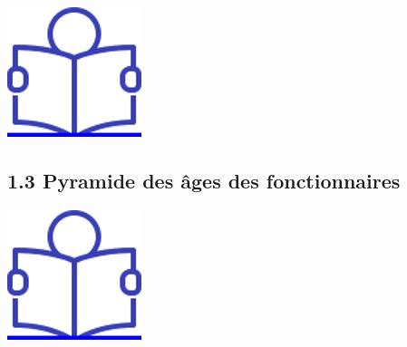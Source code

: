 \href{../Docs/Notices/fiche_1.odt}{\includegraphics{icones/Notice.png}}

\hypertarget{pyramide-des-ages-des-fonctionnaires}{%
\subsection{1.3 Pyramide des âges des fonctionnaires
~}\label{pyramide-des-ages-des-fonctionnaires}}

\href{../Docs/Notices/fiche_2.odt}{\includegraphics{icones/Notice.png}}


